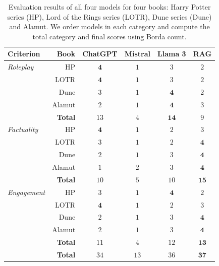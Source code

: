\documentclass[fleqn,moreauthors,10pt]{ds_report}
\begin{document}
\begin{table}
    \footnotesize
    \centering
    \begin{tabular}{lr|cccc}
        \toprule
        Criterion & Book & \textbf{ChatGPT} & \textbf{Mistral}
            & \textbf{Llama 3} & \textbf{RAG} \\
        \midrule
        \emph{Roleplay} & HP     & $\mathbf{4}$ & $1$ & $3$ & $2$ \\ 
                        & LOTR   & $\mathbf{4}$ & $1$ & $3$ & $2$ \\ 
                        & Dune   & $3$ & $1$ & $\mathbf{4}$ & $2$ \\ 
                        & Alamut & $2$ & $1$ & $\mathbf{4}$ & $3$ \\
                & \textbf{Total} & $13$ & $4$ & $\mathbf{14}$ & $9$ \\
        \midrule
        \emph{Factuality} & HP     & $\mathbf{4}$ & $1$ & $2$ & $3$ \\ 
                       & LOTR   & $3$ & $1$ & $2$ & $\mathbf{4}$ \\ 
                       & Dune   & $2$ & $1$ & $3$ & $\mathbf{4}$ \\ 
                       & Alamut & $1$ & $2$ & $3$ & $\mathbf{4}$ \\
                & \textbf{Total} & $10$ & $5$ & $10$ & $\mathbf{15}$ \\
        \midrule
        \emph{Engagement} & HP     & $3$ & $1$ & $\mathbf{4}$ & $2$ \\ 
                          & LOTR   & $\mathbf{4}$ & $1$ & $2$ & $3$ \\ 
                          & Dune   & $2$ & $1$ & $3$ & $\mathbf{4}$ \\ 
                          & Alamut & $2$ & $1$ & $3$ & $\mathbf{4}$ \\
                & \textbf{Total} & $11$ & $4$ & $12$ & $\mathbf{13}$ \\
        \midrule
        & \textbf{Total} & $34$ & $13$ & $36$ & $\mathbf{37}$ \\
        \bottomrule
    \end{tabular}
    \vskip 2mm
    \caption{
        Evaluation results of all four models for four books: Harry Potter
        series (HP), Lord of the Rings series (LOTR), Dune series (Dune)
        and Alamut. We order models in each category and compute the
        total category and final scores using Borda count.
    }
    \label{tab:results}
\end{table}
\end{document}
